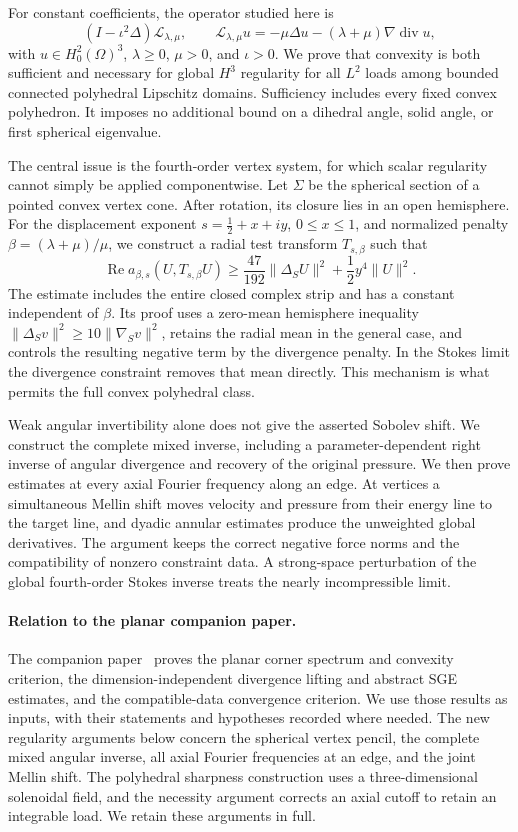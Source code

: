 \documentclass[11pt,a4paper]{article}
\theoremstyle{remark}
\numberwithin{equation}{section}
\begin{document}
For constant coefficients, the operator studied here is
\[
 (I-\iota^2\Delta)\mathcal L_{\lambda,\mu},
 \qquad
 \mathcal L_{\lambda,\mu}u=-\mu\Delta u
                  -(\lambda+\mu)\nabla\operatorname{div}u,
\]
with \(u\in H^2_0(\Omega)^3\), \(\lambda\ge0\), \(\mu>0\), and
\(\iota>0\). We prove that convexity is both sufficient and necessary for
global \(H^3\) regularity for all \(L^2\) loads among bounded connected
polyhedral Lipschitz domains. Sufficiency includes every fixed convex
polyhedron. It imposes no additional bound on a dihedral angle, solid
angle, or first spherical eigenvalue.

The central issue is the fourth-order vertex system, for which scalar
regularity cannot simply be applied componentwise. Let \(\Sigma\) be the
spherical section of a pointed convex vertex cone. After rotation, its
closure lies in an open hemisphere. For the displacement exponent
\(s=\tfrac12+x+iy\), \(0\le x\le1\), and normalized penalty
\(\beta=(\lambda+\mu)/\mu\), we construct a radial test transform
\(T_{s,\beta}\) such that
\[
 \operatorname{Re}a_{\beta,s}(U,T_{s,\beta}U)
 \ge\frac{47}{192}\|\Delta_SU\|^2
       +\frac12y^4\|U\|^2.
\]
The estimate includes the entire closed complex strip and has a constant
independent of \(\beta\). Its proof uses a zero-mean hemisphere inequality
\(\|\Delta_Sv\|^2\ge10\|\nabla_Sv\|^2\), retains the radial mean in the
general case, and controls the resulting negative term by the
divergence penalty. In the Stokes limit the divergence constraint removes
that mean directly. This mechanism is what permits the full convex
polyhedral class.

Weak angular invertibility alone does not give the asserted Sobolev
shift. We construct the complete mixed inverse, including a
parameter-dependent right inverse of angular divergence and recovery of
the original pressure. We then prove estimates at every axial Fourier
frequency along an edge. At vertices a simultaneous Mellin shift moves
velocity and pressure from their energy line to the target line, and
dyadic annular estimates produce the unweighted global derivatives.
The argument keeps the correct negative force norms and the compatibility
of nonzero constraint data. A strong-space perturbation of the global
fourth-order Stokes inverse treats the nearly incompressible limit.

\paragraph{Relation to the planar companion paper.}
The companion paper~\cite{PolygonCompanion2026} proves the planar corner
spectrum and convexity criterion, the dimension-independent divergence
lifting and abstract SGE estimates, and the compatible-data convergence
criterion. We use those results as inputs, with their statements and
hypotheses recorded where needed. The new regularity arguments below
concern the spherical vertex pencil, the complete mixed angular inverse,
all axial Fourier frequencies at an edge, and the joint Mellin shift.
The polyhedral sharpness construction uses a three-dimensional
solenoidal field, and the necessity argument corrects an axial cutoff
to retain an integrable load. We retain these arguments in full.
\end{document}
